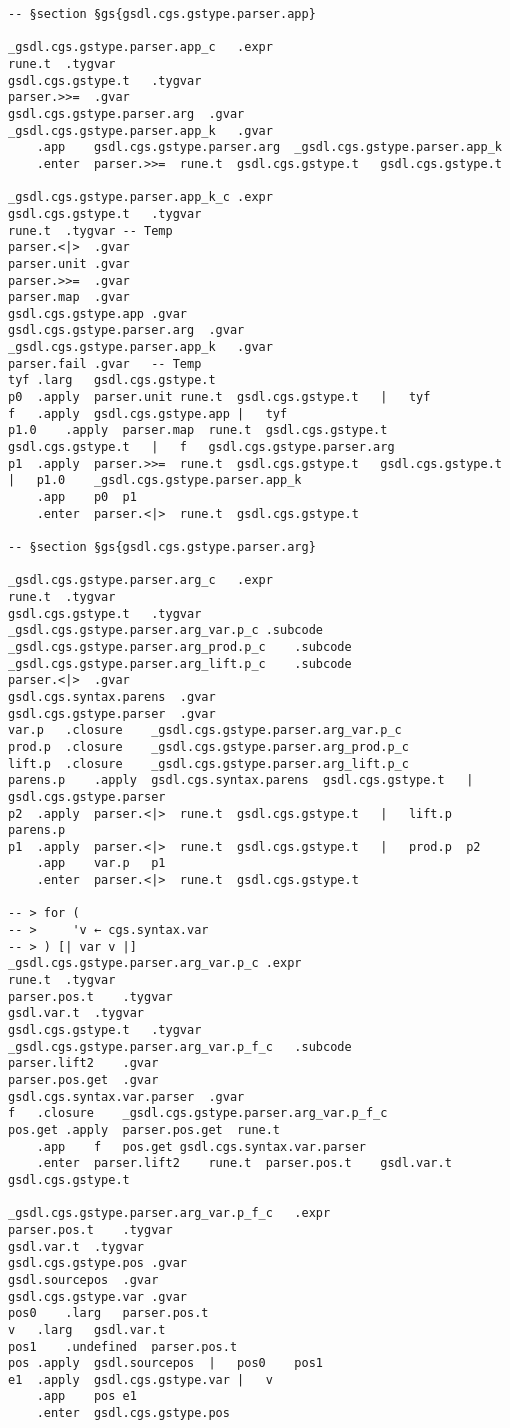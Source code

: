 \documentclass{report}
\begin{document}
\begin{verbatim}
-- §section §gs{gsdl.cgs.gstype.parser.app}

_gsdl.cgs.gstype.parser.app_c	.expr
rune.t	.tygvar
gsdl.cgs.gstype.t	.tygvar
parser.>>=	.gvar
gsdl.cgs.gstype.parser.arg	.gvar
_gsdl.cgs.gstype.parser.app_k	.gvar
	.app	gsdl.cgs.gstype.parser.arg	_gsdl.cgs.gstype.parser.app_k
	.enter	parser.>>=	rune.t	gsdl.cgs.gstype.t	gsdl.cgs.gstype.t

_gsdl.cgs.gstype.parser.app_k_c	.expr
gsdl.cgs.gstype.t	.tygvar
rune.t	.tygvar	-- Temp
parser.<|>	.gvar
parser.unit	.gvar
parser.>>=	.gvar
parser.map	.gvar
gsdl.cgs.gstype.app	.gvar
gsdl.cgs.gstype.parser.arg	.gvar
_gsdl.cgs.gstype.parser.app_k	.gvar
parser.fail	.gvar	-- Temp
tyf	.larg	gsdl.cgs.gstype.t
p0	.apply	parser.unit	rune.t	gsdl.cgs.gstype.t	|	tyf
f	.apply	gsdl.cgs.gstype.app	|	tyf
p1.0	.apply	parser.map	rune.t	gsdl.cgs.gstype.t	gsdl.cgs.gstype.t	|	f	gsdl.cgs.gstype.parser.arg
p1	.apply	parser.>>=	rune.t	gsdl.cgs.gstype.t	gsdl.cgs.gstype.t	|	p1.0	_gsdl.cgs.gstype.parser.app_k
	.app	p0	p1
	.enter	parser.<|>	rune.t	gsdl.cgs.gstype.t

-- §section §gs{gsdl.cgs.gstype.parser.arg}

_gsdl.cgs.gstype.parser.arg_c	.expr
rune.t	.tygvar
gsdl.cgs.gstype.t	.tygvar
_gsdl.cgs.gstype.parser.arg_var.p_c	.subcode
_gsdl.cgs.gstype.parser.arg_prod.p_c	.subcode
_gsdl.cgs.gstype.parser.arg_lift.p_c	.subcode
parser.<|>	.gvar
gsdl.cgs.syntax.parens	.gvar
gsdl.cgs.gstype.parser	.gvar
var.p	.closure	_gsdl.cgs.gstype.parser.arg_var.p_c
prod.p	.closure	_gsdl.cgs.gstype.parser.arg_prod.p_c
lift.p	.closure	_gsdl.cgs.gstype.parser.arg_lift.p_c
parens.p	.apply	gsdl.cgs.syntax.parens	gsdl.cgs.gstype.t	|	gsdl.cgs.gstype.parser
p2	.apply	parser.<|>	rune.t	gsdl.cgs.gstype.t	|	lift.p	parens.p
p1	.apply	parser.<|>	rune.t	gsdl.cgs.gstype.t	|	prod.p	p2
	.app	var.p	p1
	.enter	parser.<|>	rune.t	gsdl.cgs.gstype.t

-- > for (
-- >     'v ← cgs.syntax.var
-- > ) [| var v |]
_gsdl.cgs.gstype.parser.arg_var.p_c	.expr
rune.t	.tygvar
parser.pos.t	.tygvar
gsdl.var.t	.tygvar
gsdl.cgs.gstype.t	.tygvar
_gsdl.cgs.gstype.parser.arg_var.p_f_c	.subcode
parser.lift2	.gvar
parser.pos.get	.gvar
gsdl.cgs.syntax.var.parser	.gvar
f	.closure	_gsdl.cgs.gstype.parser.arg_var.p_f_c
pos.get	.apply	parser.pos.get	rune.t
	.app	f	pos.get	gsdl.cgs.syntax.var.parser
	.enter	parser.lift2	rune.t	parser.pos.t	gsdl.var.t	gsdl.cgs.gstype.t

_gsdl.cgs.gstype.parser.arg_var.p_f_c	.expr
parser.pos.t	.tygvar
gsdl.var.t	.tygvar
gsdl.cgs.gstype.pos	.gvar
gsdl.sourcepos	.gvar
gsdl.cgs.gstype.var	.gvar
pos0	.larg	parser.pos.t
v	.larg	gsdl.var.t
pos1	.undefined	parser.pos.t
pos	.apply	gsdl.sourcepos	|	pos0	pos1
e1	.apply	gsdl.cgs.gstype.var	|	v
	.app	pos	e1
	.enter	gsdl.cgs.gstype.pos


\end{verbatim}
\end{document}
